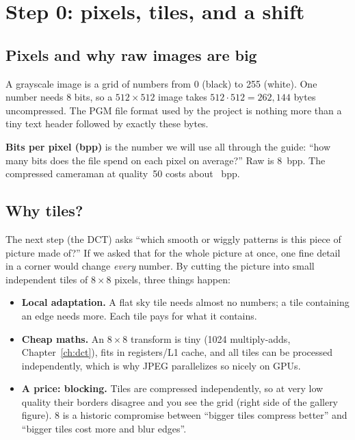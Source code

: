 \chapter{Step 0: pixels, tiles, and a shift}

\section{Pixels and why raw images are big}

A grayscale image is a grid of numbers from 0 (black) to 255 (white). One number needs 8 bits, so a $512\times512$ image takes $512\cdot512 = 262{,}144$ bytes uncompressed. The PGM file format used by the project is nothing more than a tiny text header followed by exactly these bytes.

\begin{plain}
\textbf{Bits per pixel (bpp)} is the number we will use all through the guide: ``how many bits does the file spend on each pixel on average?'' Raw is 8~bpp. The compressed cameraman at quality~50 costs about \camQfiftyBpp\ bpp.
\end{plain}

\section{Why tiles?}

The next step (the DCT) asks ``which smooth or wiggly patterns is this piece of picture made of?'' If we asked that for the whole picture at once, one fine detail in a corner would change \emph{every} number. By cutting the picture into small independent tiles of $8\times 8$ pixels, three things happen:

\begin{itemize}
\item \textbf{Local adaptation.} A flat sky tile needs almost no numbers; a tile containing an edge needs more. Each tile pays for what it contains.
\item \textbf{Cheap maths.} An $8\times8$ transform is tiny (1024 multiply-adds, Chapter~\ref{ch:dct}), fits in registers/L1 cache, and all tiles can be processed independently, which is why JPEG parallelizes so nicely on GPUs.
\item \textbf{A price: blocking.} Tiles are compressed independently, so at very low quality their borders disagree and you see the grid (right side of the gallery figure). 8 is a historic compromise between ``bigger tiles compress better'' and ``bigger tiles cost more and blur edges''.
\end{itemize}

